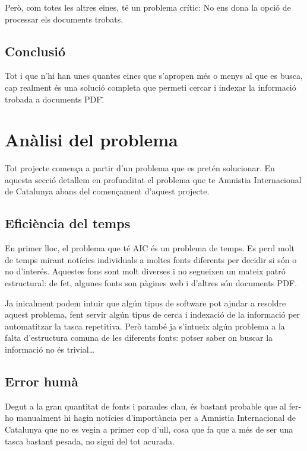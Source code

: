 \documentclass{article}
\begin{document}
Però, com totes les altres eines, té un problema crític: No ens dona la opció de processar els documents trobats.

\subsection{Conclusió}

Tot i que n'hi han unes quantes eines que s'apropen més o menys al que es busca, cap realment és una solució completa que permeti cercar i indexar la informació trobada a documents PDF\".

\newpage

\section{Anàlisi del problema}

Tot projecte comença a partir d'un problema que es pretén solucionar. En aquesta secció detallem en profunditat el problema que te Amnistia Internacional de Catalunya abans del començament d'aquest projecte.

\subsection{Eficiència del temps}

En primer lloc, el problema que té AIC és un problema de temps. Es perd molt de temps mirant notícies individuals a moltes fonts diferents per decidir si són o no d'interés. Aquestes fons sont molt diverses i no segueixen un mateix patró estructural: de fet, algunes fonts son pàgines web i d'altres són documents PDF\@.

Ja inicalment podem intuir que algún tipus de software pot ajudar a resoldre aquest problema, fent servir algún tipus de cerca i indexació de la informació per automatitzar la tasca repetitiva. Però també ja s'intueix algún problema a la falta d'estructura comuna de les diferents fonts: potser saber on buscar la informació no és trivial\ldots

\subsection{Error humà}

Degut a la gran quantitat de fonts i paraules clau, és bastant probable que al fer-ho manualment hi hagin notícies d'importància per a Amnistia Internacional de Catalunya que no es vegin a primer cop d'ull, cosa que fa que a més de ser una tasca bastant pesada, no sigui del tot acurada.
\end{document}
